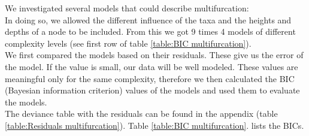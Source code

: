       We investigated several models that could describe multifurcation: \\
      In doing so, we allowed the different influence of the taxa and the heights and depths of a node 
        to be included. From this we got 9 times 4 models of different complexity levels (see first row 
        of table \ref{table:BIC multifurcation}). \\
      We first compared the models based on their residuals. These give us the error of the model. If 
        the value is small, our data will be well modeled. These values are meaningful only for the same 
        complexity, therefore we then calculated the BIC (Bayesian information criterion) values of the 
        models and used them to evaluate the models. \\
      The deviance table with the residuals can be found in the appendix (table 
        \ref{table:Residuals multifurcation}). Table \ref{table:BIC multifurcation}. lists the BICs.

